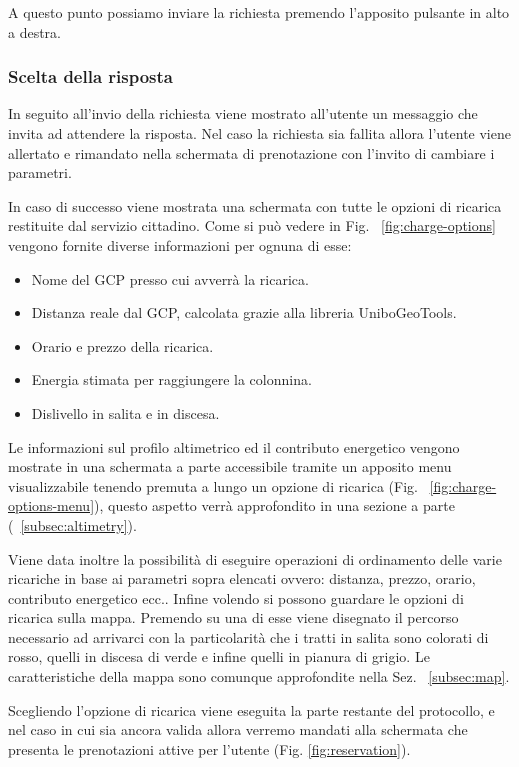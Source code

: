A questo punto possiamo inviare la richiesta premendo l'apposito pulsante in alto a destra.

\subsubsection{Scelta della risposta}

In seguito all'invio della richiesta viene mostrato all'utente un messaggio che invita ad attendere la risposta. Nel caso la richiesta sia fallita allora l'utente viene allertato e rimandato nella schermata di prenotazione con l'invito di cambiare i parametri.

In caso di successo viene mostrata una schermata con tutte le opzioni di ricarica restituite dal servizio cittadino. Come si può vedere in Fig. ~\ref{fig:charge-options} vengono fornite diverse informazioni per ognuna di esse:

\begin{itemize}
	\item Nome del GCP presso cui avverrà la ricarica.
	\item Distanza reale dal GCP, calcolata grazie alla libreria UniboGeoTools.
	\item Orario e prezzo della ricarica.
	\item Energia stimata per raggiungere la colonnina.
	\item Dislivello in salita e in discesa.
\end{itemize}

Le informazioni sul profilo altimetrico ed il contributo energetico vengono mostrate in una schermata a parte accessibile tramite un apposito menu visualizzabile tenendo premuta a lungo un opzione di ricarica (Fig. ~\ref{fig:charge-options-menu}), questo aspetto verrà approfondito in una sezione a parte (~\ref{subsec:altimetry}).

Viene data inoltre la possibilità di eseguire operazioni di ordinamento delle varie ricariche in base ai parametri sopra elencati ovvero: distanza, prezzo, orario, contributo energetico ecc.. Infine volendo si possono guardare le opzioni di ricarica sulla mappa. Premendo su una di esse viene disegnato il percorso necessario ad arrivarci con la particolarità che i tratti in salita sono colorati di rosso, quelli in discesa di verde e infine quelli in pianura di grigio. Le caratteristiche della mappa sono comunque approfondite nella Sez. ~\ref{subsec:map}.

Scegliendo l'opzione di ricarica viene eseguita la parte restante del protocollo, e nel caso in cui sia ancora valida allora verremo mandati alla schermata che presenta le prenotazioni attive per l'utente (Fig. \ref{fig:reservation}).


